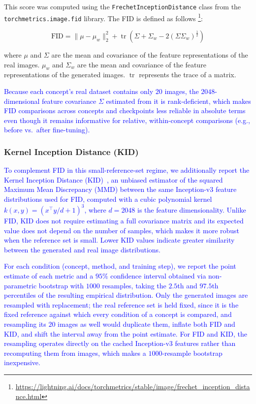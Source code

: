\documentclass[pdflatex,sn-mathphys-num]{sn-jnl}%
\theoremstyle{thmstyleone}%
\theoremstyle{thmstyletwo}%
\theoremstyle{thmstylethree}%
\begin{document}
This score was computed using the \texttt{FrechetInceptionDistance} class from the \texttt{torchmetrics.image.fid} library. The FID is defined as follows \footnote{\url{https://lightning.ai/docs/torchmetrics/stable/image/frechet_inception_distance.html}}:

\[
\text{FID} = \|\mu - \mu_w\|_2^2 + \operatorname{tr}\left(\Sigma + \Sigma_w - 2(\Sigma \Sigma_w)^{\frac{1}{2}}\right)
\]

where \( \mu \) and \( \Sigma \) are the mean and covariance of the feature representations of the real images. \( \mu_w \) and \( \Sigma_w \) are the mean and covariance of the feature representations of the generated images. \( \operatorname{tr} \) represents the trace of a matrix.

\textcolor{blue}{Because each concept's real dataset contains only $20$ images, the $2048$-dimensional feature covariance $\Sigma$ estimated from it is rank-deficient, which makes FID comparisons across concepts and checkpoints less reliable in absolute terms even though it remains informative for relative, within-concept comparisons (e.g., before vs.\ after fine-tuning).}

\subsubsection{Kernel Inception Distance (KID)}

\textcolor{blue}{To complement FID in this small-reference-set regime, we additionally report the Kernel Inception Distance (KID)~\cite{binkowski2018demystifying}, an unbiased estimator of the squared Maximum Mean Discrepancy (MMD) between the same Inception-v3 feature distributions used for FID, computed with a cubic polynomial kernel $k(x,y) = (x^\top y / d + 1)^3$, where $d=2048$ is the feature dimensionality. Unlike FID, KID does not require estimating a full covariance matrix and its expected value does not depend on the number of samples, which makes it more robust when the reference set is small. Lower KID values indicate greater similarity between the generated and real image distributions.}

\textcolor{blue}{For each condition (concept, method, and training step), we report the point estimate of each metric and a $95\%$ confidence interval obtained via non-parametric bootstrap with $1000$ resamples, taking the $2.5$th and $97.5$th percentiles of the resulting empirical distribution. Only the generated images are resampled with replacement; the real reference set is held fixed, since it is the fixed reference against which every condition of a concept is compared, and resampling its $20$ images as well would duplicate them, inflate both FID and KID, and shift the interval away from the point estimate. For FID and KID, the resampling operates directly on the cached Inception-v3 features rather than recomputing them from images, which makes a $1000$-resample bootstrap inexpensive.}
\end{document}
